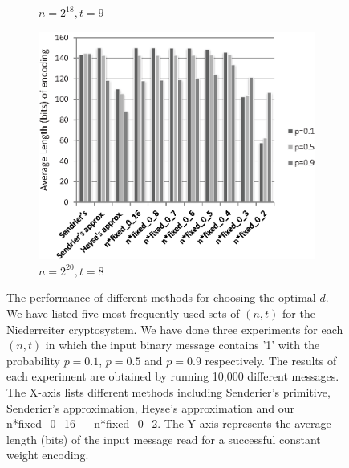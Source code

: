 \documentclass[10pt,journal,compsoc]{IEEEtran}
\begin{document}
\begin{figure}[!htb]
\begin{subfigure}{.42\textwidth}
\caption{$n=2^{18},t=9$}
\end{subfigure}
\hfill
\begin{subfigure}{.42\textwidth}\centering
\includegraphics[width=\textwidth,height=.27\textheight]{./fig/best_d-20-8.eps}
\caption{$n=2^{20},t=8$}
\end{subfigure}
\caption{The performance of different methods for choosing the optimal $d$.
We have listed  five most frequently used sets of $(n, t)$  for the Niederreiter cryptosystem.
We have done three experiments for each $(n, t)$ in which the input binary message contains '1' with the probability $p=0.1$, $p=0.5$ and $p=0.9$ respectively.
The results of each experiment are obtained by running 10,000 different messages.
The X-axis lists different methods including Senderier's primitive\cite{sendrier2005encoding}, Senderier's approximation\cite{sendrier2005encoding},
Heyse's approximation\cite{heyse2012towards}  and our n*fixed\_0\_16 --- n*fixed\_0\_2. The Y-axis represents the average length (bits) of the input message read for
a successful constant weight encoding.}
\label{fig:best_d}
\end{figure}
\end{document}

